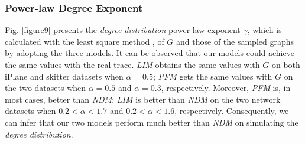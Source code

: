 \documentclass[a4paper]{llncs}
\begin{document}
\begin{figure*}[!t]
\centering
{}
\hspace{2em}
\vspace{-1.7em}
\caption{The {\it degree distribution} power-law exponent $\gamma$ of the sampled graphs by using the three models, compared with that of $G$, on the two real datasets, respectively.}
\label{figure9}
\vspace{-0.5em}
\end{figure*}



\subsubsection{Power-law Degree Exponent}
Fig. \ref{figure9} presents the {\it degree distribution} power-law exponent $\gamma$, which is calculated with the
least square method \cite{LeastSquareMethod}, of $G$ and those of
the sampled graphs by adopting the three models. It can be observed that our models
could achieve the same values with the real trace.
\textit{LIM} obtains the same values with $G$ on both iPlane and skitter datasets when $\alpha =
0.5$; \textit{PFM} gets the same values with $G$ on
the two datasets when $\alpha=0.5$ and
$\alpha=0.3$, respectively. Moreover, \textit{PFM} is, in most cases, better
than \textit{NDM}; \textit{LIM} is better than \textit{NDM} on the two network datasets when $0.2 < \alpha < 1.7$ and $0.2 < \alpha <
1.6$, respectively. Consequently, we can infer that our two models perform much better than \textit{NDM} on simulating the {\it degree distribution}.



\begin{figure*}[!t]
\centering
{}
\hspace{2em}
\vspace{-1.7em}
\caption{The {\it clustering coefficient} of the sampled graphs by using the three models, compared with that of $G$, on two real datasets: iPlane and skitter, respectively.}
\label{figure10}
\vspace{-0.8em}
\end{figure*}
\end{document}
